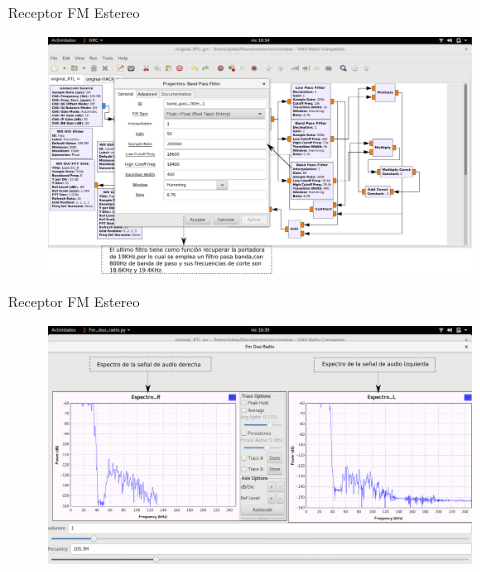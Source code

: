 \begin{frame}{Receptor FM Estereo}

\begin{figure}[H]
\centering
\vspace{-3mm}
\includegraphics[width=\textwidth]{parte3/lab9/pdf/lab9_4.pdf}
\end{figure}

\end{frame}

\begin{frame}{Receptor FM Estereo}

\begin{figure}[H]
\centering
\vspace{-3mm}
\includegraphics[width=\textwidth]{parte3/lab9/pdf/lab9_5.pdf}
\end{figure}

\end{frame}
